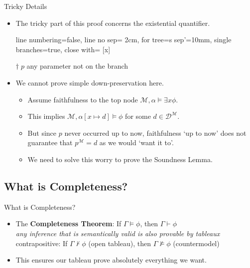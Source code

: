 \begin{frame}{Tricky Details}

	\begin{itemize}%
	\itemsep=16pt
		
	\item The tricky part of this proof concerns the existential quantifier.

	\smallskip

	\begin{center}

			\begin{prooftree}
			{
			line numbering=false,
			line no sep= 2cm,
			for tree={s sep'=10mm},
			single branches=true,
			close with=\xmark
			}
			[\exists x\phi [\phi\lbrack x:\!{=}\, p\rbrack^\dagger ] ]
			\end{prooftree}

	\bigskip
	$\dagger\; p$ any parameter not on the branch

	\end{center}

	\item We cannot prove simple down-preservation here.
		\begin{itemize}%
		\item Assume faithfulness to the top node $\mathcal{M},\alpha\vDash\exists x\phi$.
		\item This implies $\mathcal{M},\alpha[x\mapsto d]\vDash\phi$ for some $d\in\mathcal{D}^\mathcal{M}$.
		\item But since $p$ never occurred up to now, faithfulness `up to now' does not guarantee that $p^\mathcal{M}=d$ as we would `want it to'.
		\item We need to solve this worry to prove the Soundness Lemma.
		\end{itemize}

	\end{itemize}

\end{frame}

\subsection{What is Completeness?}
\begin{frame}{What is Completeness?}

	\begin{itemize}%
	\itemsep=16pt
		
	\item The \textbf{Completeness Theorem}: If $\Gamma\vDash\phi$, then $\Gamma\vdash\phi$
	\\
	\alert{\emph{\small{any inference that is semantically valid is also provable by tableaux}}}
	\\
	{\small contrapositive: If $\Gamma\nvdash\phi$ (open tableau), then $\Gamma\nvDash\phi$ (countermodel)}

	\item This ensures our tableau prove absolutely everything we want.

	\end{itemize}

\end{frame}

